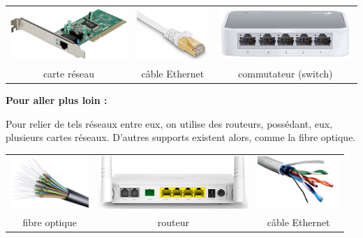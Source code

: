 \begin{center}\begin{tabular}{ccc}
\includegraphics[height=2cm]{images/carteEths.jpg} & \includegraphics[height=2cm]{images/rj45s.jpg} & \includegraphics[height=2cm]{images/switch.jpg} \\
carte réseau & câble Ethernet & commutateur (switch) \\
\end{tabular}\end{center}

{\bfseries Pour aller plus loin : } 

Pour relier de tels réseaux entre eux, on utilise des routeurs, possédant, eux, plusieurs cartes réseaux. D'autres supports existent alors, comme la fibre optique.

\begin{center}\begin{tabular}{ccc}
\includegraphics[height=2cm]{images/fibre.png} & \includegraphics[height=2cm]{images/routeur.png} & \includegraphics[height=2cm]{images/torsades.jpg}\\
fibre optique & routeur & câble Ethernet \\
\end{tabular}\end{center}

